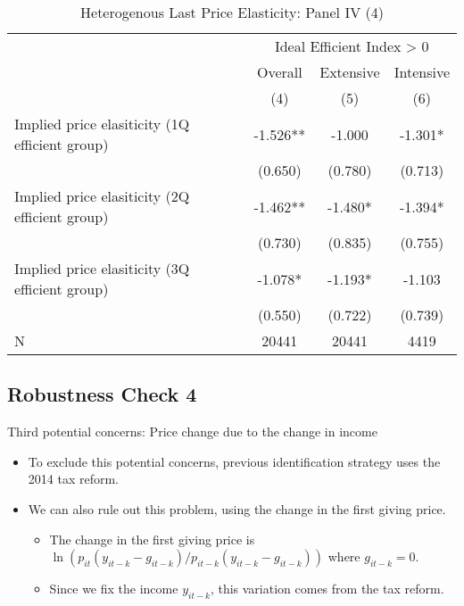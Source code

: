 \documentclass[ review  , 3p ]{elsarticle}
\providecommand{\tightlist}{%
  \setlength{\itemsep}{0pt}\setlength{\parskip}{0pt}}
\begin{document}
  \begin{table}
  
  \caption{\label{tab:kableHeteroShortElasticitySlide4}Heterogenous Last Price Elasticity: Panel IV (4)}
  \centering
  \fontsize{8}{10}\selectfont
  \begin{tabular}[t]{lccc}
  \toprule
  \multicolumn{1}{c}{ } & \multicolumn{3}{c}{Ideal Efficient Index > 0} \\
  \cmidrule(l{3pt}r{3pt}){2-4}
  \multicolumn{1}{c}{ } & \multicolumn{1}{c}{Overall} & \multicolumn{1}{c}{Extensive} & \multicolumn{1}{c}{Intensive} \\
  \cmidrule(l{3pt}r{3pt}){2-2} \cmidrule(l{3pt}r{3pt}){3-3} \cmidrule(l{3pt}r{3pt}){4-4}
   & (4) & (5) & (6)\\
  \midrule
  Implied price elasiticity (1Q efficient group) & -1.526** & -1.000 & -1.301*\\
   & (0.650) & (0.780) & (0.713)\\
  Implied price elasiticity (2Q efficient group) & -1.462** & -1.480* & -1.394*\\
   & (0.730) & (0.835) & (0.755)\\
  Implied price elasiticity (3Q efficient group) & -1.078* & -1.193* & -1.103\\
   & (0.550) & (0.722) & (0.739)\\
  N & 20441 & 20441 & 4419\\
  \bottomrule
  \end{tabular}
  \end{table}
  
  \hypertarget{robustness-check-4}{%
  \subsection{Robustness Check 4}\label{robustness-check-4}}
  
  Third potential concerns: Price change due to the change in income
  
  \begin{itemize}
  \tightlist
  \item
    To exclude this potential concerns, previous identification strategy uses the 2014 tax reform.
  \item
    We can also rule out this problem, using the change in the first giving price.
  
    \begin{itemize}
    \tightlist
    \item
      The change in the first giving price is \(\ln(p_{it}(y_{it-k} - g_{it-k})/p_{it-k}(y_{it-k} - g_{it-k}))\) where \(g_{it-k} = 0\).
    \item
      Since we fix the income \(y_{it-k}\), this variation comes from the tax reform.
    \end{itemize}
  \end{itemize}
  
\end{document}
